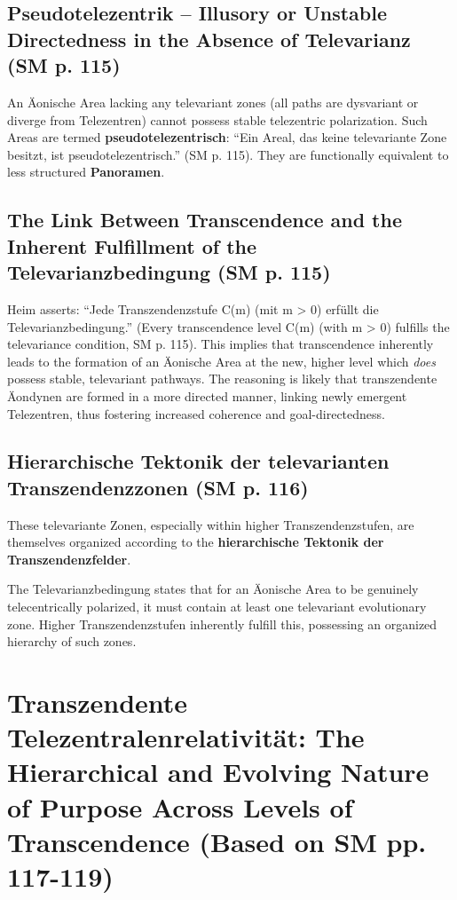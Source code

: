 \documentclass[
    12pt,              %
    a4paper,           %
    headings=normal,   %
    twoside=true,      %
    BCOR=8mm,          %
]{scrbook}
\newcommand{\q}[1]{\enquote{#1}}
\begin{document}
\subsection{Pseudotelezentrik – Illusory or Unstable Directedness in the Absence of Televarianz (SM p. 115)}
\label{sec:ch6_pseudotelezentrik}
An Äonische Area lacking any televariant zones (all paths are dysvariant or diverge from Telezentren) cannot possess stable telezentric polarization. Such Areas are termed \textbf{pseudotelezentrisch}: \q{Ein Areal, das keine televariante Zone besitzt, ist pseudotelezentrisch.} (SM p. 115). They are functionally equivalent to less structured \textbf{Panoramen}.

\subsection{The Link Between Transcendence and the Inherent Fulfillment of the Televarianzbedingung (SM p. 115)}
\label{sec:ch6_transcendence_televarianz}
Heim asserts: \q{Jede Transzendenzstufe C(m) (mit m > 0) erfüllt die Televarianzbedingung.} (Every transcendence level C(m) (with m > 0) fulfills the televariance condition, SM p. 115). This implies that transcendence inherently leads to the formation of an Äonische Area at the new, higher level which \textit{does} possess stable, televariant pathways. The reasoning is likely that transzendente Äondynen are formed in a more directed manner, linking newly emergent Telezentren, thus fostering increased coherence and goal-directedness.

\subsection{Hierarchische Tektonik der televarianten Transzendenzzonen (SM p. 116)}
\label{sec:ch6_hierarchische_tektonik_televarianz}
These televariante Zonen, especially within higher Transzendenzstufen, are themselves organized according to the \textbf{hierarchische Tektonik der Transzendenzfelder}.

The Televarianzbedingung states that for an Äonische Area to be genuinely telecentrically polarized, it must contain at least one televariant evolutionary zone. Higher Transzendenzstufen inherently fulfill this, possessing an organized hierarchy of such zones.

\section{Transzendente Telezentralenrelativität: The Hierarchical and Evolving Nature of Purpose Across Levels of Transcendence (Based on SM pp. 117-119)}
\label{sec:ch6_telezentralenrelativitaet}
\end{document}
